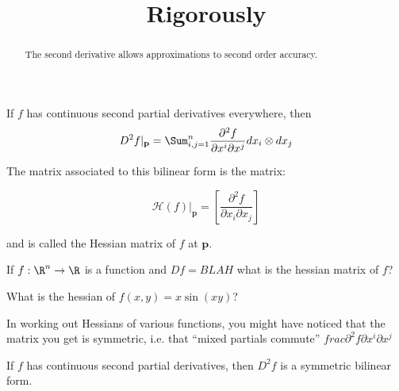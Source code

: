 \documentclass{ximera}
\title{Rigorously}
\begin{document}
	\begin{abstract}
		The second derivative allows approximations to second order accuracy.
	\end{abstract}
	
	\begin{theorem}
	If $f$ has continuous second partial derivatives everywhere, then 
	\[
		D^2f|_\mathbf{p}  = \Sum_{i,j=1}^n \frac{\partial^2 f}{\partial x^i \partial x^j} dx_i \otimes dx_j
	\]
	
	The matrix associated to this bilinear form is the matrix:
	
		\[ 
		
		\mathcal{H}(f)\big|_\mathbf{p} = [\frac{\partial^2 f}{\partial x_i \partial x_j}]
	
		\]
		
		and is called the Hessian matrix of $f$ at $\mathbf{p}$.
\end{theorem}

\begin{question}
	If $f:\R^n \to \R$ is a function and $Df = BLAH$ what is the hessian matrix of $f$?
\end{question}

\begin{question}
	What is the hessian of $f(x,y) = x\sin(xy)$?
\end{question}

In working out Hessians of various functions, you might have noticed that the matrix you get is symmetric, i.e.  that ``mixed partials commute'' 
$frac{\partial^2 f}{\partial x^i \partial x^j}$

\begin{theorem}
	If $f$ has continuous second partial derivatives, then $D^2f$ is a symmetric bilinear form.
\end{theorem}
 
\end{document}
